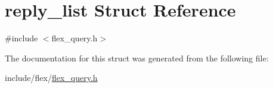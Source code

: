 \hypertarget{structreply__list}{}\section{reply\+\_\+list Struct Reference}
\label{structreply__list}


{\ttfamily \#include $<$flex\+\_\+query.\+h$>$}



The documentation for this struct was generated from the following file\+:\begin{DoxyCompactItemize}
\item 
include/flex/\hyperlink{flex__query_8h}{flex\+\_\+query.\+h}\end{DoxyCompactItemize}
